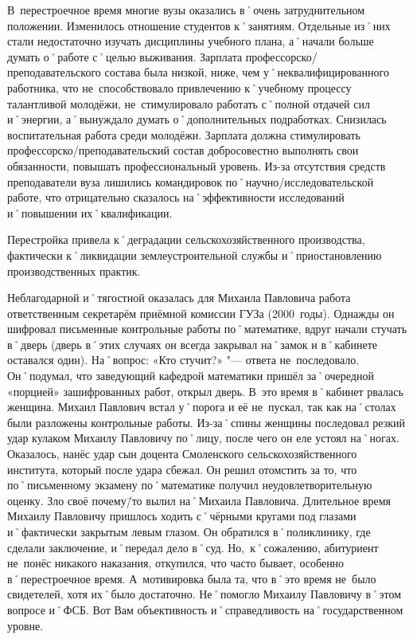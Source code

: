 В~перестроечное время многие вузы оказались в˚очень затруднительном положении. Изменилось отношение студентов к˚занятиям. Отдельные из˚них стали недостаточно изучать дисциплины учебного плана, а˚начали больше думать о˚работе с˚целью выживания. Зарплата профессорско\-/преподавательского состава была низкой, ниже, чем у˚неквалифицированного работника, что не~способствовало привлечению к˚учебному процессу талантливой молодёжи, не~стимулировало работать с˚полной отдачей сил и˚энергии, а˚вынуждало думать о˚дополнительных подработках. Снизилась воспитательная работа среди молодёжи. Зарплата должна стимулировать профессорско\-/преподавательский состав добросовестно выполнять свои обязанности, повышать профессиональный уровень. Из-за отсутствия средств преподаватели вуза лишились командировок по˚научно\-/исследовательской работе, что отрицательно сказалось на˚эффективности исследований и˚повышении их˚квалификации. 

Перестройка привела к˚деградации сельскохозяйственного производства, фактически к˚ликвидации землеустроительной службы и˚приостановлению производственных практик. 

Неблагодарной и˚тягостной оказалась для Михаила Павловича работа ответственным секретарём приёмной комиссии ГУЗа (2000~годы). Однажды он шифровал письменные контрольные работы по˚математике, вдруг начали стучать в˚дверь (дверь в˚этих случаях он всегда закрывал на˚замок и в˚кабинете оставался один). На˚вопрос: «Кто стучит?» "--- ответа не~последовало. Он˚подумал, что заведующий кафедрой математики пришёл за˚очередной «порцией» зашифрованных работ, открыл дверь. В~это время в˚кабинет рвалась женщина. Михаил Павлович встал у˚порога и её не~пускал, так как на˚столах были разложены контрольные работы. Из-за˚спины женщины последовал резкий удар кулаком Михаилу Павловичу по˚лицу, после чего он еле устоял на˚ногах. Оказалось, нанёс удар сын доцента Смоленского сельскохозяйственного института, который после удара сбежал. Он решил отомстить за то, что по˚письменному экзамену по˚математике получил неудовлетворительную оценку. Зло своё почему\=/то вылил на˚Михаила Павловича. Длительное время Михаилу Павловичу пришлось ходить с˚чёрными кругами под глазами и˚фактически закрытым левым глазом. Он обратился в˚поликлинику, где сделали заключение, и˚передал дело в˚суд. Но,~к˚сожалению, абитуриент не~понёс никакого наказания, откупился, что часто бывает, особенно в˚перестроечное время. А~мотивировка была та, что в˚это время не~было свидетелей, хотя их˚было достаточно. Не˚помогло Михаилу Павловичу в˚этом вопросе и˚ФСБ. Вот Вам объективность и˚справедливость на˚государственном уровне.

